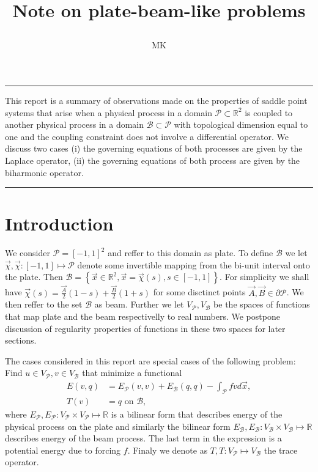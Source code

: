 \documentclass[a4paper,10pt]{article}
\newcommand{\R}{\ensuremath{\mathbb{R}}}
\newcommand{\Vp}{\ensuremath{V_{\mathcal{P}}}}
\newcommand{\Vb}{\ensuremath{V_{\mathcal{B}}}}
\newcommand{\Ep}{\ensuremath{E_{\mathcal{P}}}}
\newcommand{\Eb}{\ensuremath{E_{\mathcal{B}}}}
\renewenvironment{abstract}{%
\hfill\begin{minipage}{0.95\textwidth}
\rule{\textwidth}{1pt}}
{\par\noindent\rule{\textwidth}{1pt}\end{minipage}}
\begin{document}
%
\title{\begin{center}
        Note on plate-beam-like problems
       \end{center}}
\author[1]{MK}
%
\maketitle
%
\begin{abstract}
  This report is a summary of observations made on the properties of saddle
  point systems that arise when a physical process in a domain
  $\mathcal{P}\subset\R^2$ is coupled to another physical process in a domain
  $\mathcal{B}\subset\mathcal{P}$ with topological dimension equal to one and
  the coupling constraint does not involve a differential operator. We discuss
  two cases (i) the governing equations of both processes are given by the
  Laplace operator, (ii) the governing equations of both process are given by
  the biharmonic operator.
\end{abstract}

\section{Introduction}
  We consider $\mathcal{P}=\left[-1, 1\right]^2$ and reffer to this domain as
  plate. To define $\mathcal{B}$ we let
  $\vec{\chi}, \vec{\chi}:\left[-1, 1\right]\mapsto\mathcal{P}$ denote some
  invertible mapping from the bi-unit interval onto the plate. Then
  $\mathcal{B}=\left\{\vec{x}\in\R^2, \vec{x}=\vec{\chi}(s), s\in\left[-1,
  1\right]\right\}$. For simplicity we shall have
  $\vec{\chi}(s)=\frac{\vec{A}}{2}(1-s) +\frac{\vec{B}}{2}(1+s)$ for some
  disctinct points $\vec{A}, \vec{B}\in\partial\mathcal{P}$. We then reffer to
  the set $\mathcal{B}$ as beam. Further we let $V_{\mathcal{P}}, V_{\mathcal{B}}$
  be the spaces of functions that map plate and the beam respectivelly to real
  numbers. We postpone discussion of regularity properties of functions in these
  two spaces for later sections.

  The cases considered in this report are special cases of the following
  problem: Find $u\in\Vp, v\in\Vb$ that minimize a functional
  \begin{equation}
    \label{eq:energy}
    \begin{aligned}
      E(v, q) &= \Ep(v, v) + \Eb(q, q) - \int_{\mathcal{P}}f v d\vec{x}, \\
      T(v) &= q\text{ on }\mathcal{B},
    \end{aligned}
  \end{equation}
  where $\Ep, \Ep: \Vp\times\Vp\mapsto\R$ is a bilinear form that describes
  energy of the physical process on the plate and similarly the bilinear form
  $\Eb, \Eb:\Vb\times\Vb\mapsto\R$ describes energy of the beam process. The
  last term in the expression is a potential energy due to forcing $f$. Finaly
  we denote as $T, T:\Vp\mapsto\Vb$ the trace operator.
  
\end{document}
